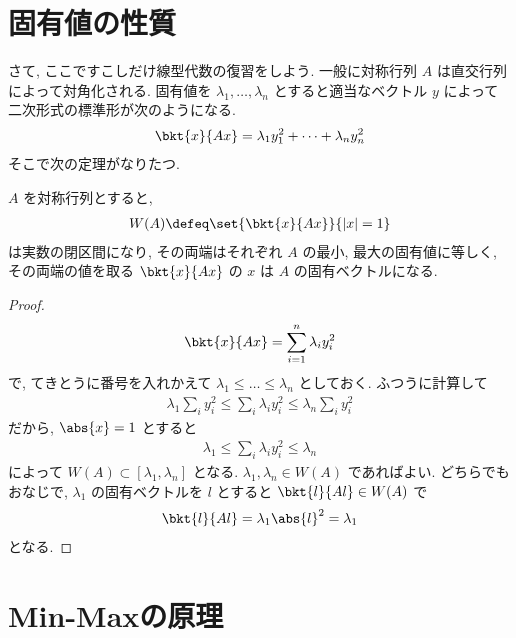 \documentclass[openany, a4paper, oneside]{jsbook}
\begin{document}
\section{固有値の性質}

さて, ここですこしだけ線型代数の復習をしよう.
一般に対称行列 $A$ は直交行列によって対角化される.
固有値を $\lambda_1, \dots, \lambda_n$ とすると適当なベクトル $y$ によって二次形式の標準形が次のようになる.
\begin{align}
 \bkt{x}{Ax}
 =
 \lambda_1 y_1^2 + \dots + \lambda_n y_n^2
\end{align}
そこで次の定理がなりたつ.
\begin{thm}
 $A$ を対称行列とすると,
 \begin{align}
  W(A)
  \defeq
  \set{\bkt{x}{Ax}}{|x| = 1}
 \end{align}
 は実数の閉区間になり, その両端はそれぞれ $A$ の最小, 最大の固有値に等しく,
 その両端の値を取る $\bkt{x}{Ax}$ の $x$ は $A$ の固有ベクトルになる.
\end{thm}
\begin{proof}
\begin{align}
 \bkt{x}{Ax}
 =
 \sum_{i=1}^n \lambda_i y_i^2
\end{align}
で, てきとうに番号を入れかえて $\lambda_1 \le \dots \le \lambda_n$ としておく.
ふつうに計算して
\begin{align}
 \lambda_1 \sum_i y_i^2
 \le
 \sum_i \lambda_i y_i^2
 \le
 \lambda_n \sum_i y_i^2
\end{align}
だから, $\abs{x}=1$ とすると
\begin{align}
 \lambda_1
 \le
 \sum_i \lambda_i y_i^2
 \le
 \lambda_n
\end{align}
によって $W(A) \subset [\lambda_1, \lambda_n]$
となる.
$\lambda_1, \lambda_n \in W(A)$ であればよい.
どちらでもおなじで, $\lambda_1$ の固有ベクトルを $l$ とすると $\bkt{l}{Al} \in W(A)$ で
\begin{align}
 \bkt{l}{Al}
 =
 \lambda_1 \abs{l}^2
 =
 \lambda_1
\end{align}
となる.
\end{proof}
\section{Min-Maxの原理}
\end{document}
